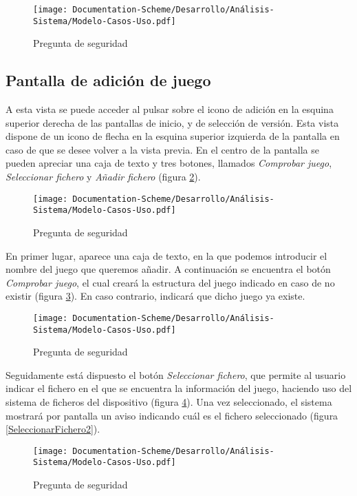 \begin{figure}[H]
    \centering
    \texttt{[image: Documentation-Scheme/Desarrollo/Análisis-Sistema/Modelo-Casos-Uso.pdf]}
    \caption{Pregunta de seguridad}
    \label{PreguntaSeguridad}    
\end{figure}

\subsection{Pantalla de adición de juego}
A esta vista se puede acceder al pulsar sobre el icono de adición en la esquina superior derecha 
de las pantallas de inicio, y de selección de versión. Esta vista dispone de un icono de flecha en la esquina superior 
izquierda de la pantalla en caso de que se desee volver a la vista previa. En el centro de la pantalla se pueden apreciar 
una caja de texto y tres botones, llamados \textit{Comprobar juego}, \textit{Seleccionar fichero} y \textit{Añadir fichero} 
(figura \ref*{AnadirJuego}). 

\begin{figure}[H]
    \centering
    \texttt{[image: Documentation-Scheme/Desarrollo/Análisis-Sistema/Modelo-Casos-Uso.pdf]}
    \caption{Pregunta de seguridad}
    \label{AnadirJuego}    
\end{figure}

En primer lugar, aparece una caja de texto, en la que podemos introducir el nombre del juego que queremos añadir.
A continuación se encuentra el botón \textit{Comprobar juego}, el cual creará la estructura del juego indicado en caso 
de no existir (figura \ref*{ComprobarJuego}). En caso contrario, indicará que dicho juego ya existe. 

\begin{figure}[H]
    \centering
    \texttt{[image: Documentation-Scheme/Desarrollo/Análisis-Sistema/Modelo-Casos-Uso.pdf]}
    \caption{Pregunta de seguridad}
    \label{ComprobarJuego}    
\end{figure}

Seguidamente está dispuesto el 
botón \textit{Seleccionar fichero}, que permite al usuario indicar el fichero en el que se encuentra la información del juego, 
haciendo uso del sistema de ficheros del dispositivo (figura \ref*{SeleccionarFichero1}). Una vez seleccionado, el sistema mostrará por pantalla un aviso indicando 
cuál es el fichero seleccionado (figura \ref*{SeleccionarFichero2}). 

\begin{figure}[H]
    \centering
    \texttt{[image: Documentation-Scheme/Desarrollo/Análisis-Sistema/Modelo-Casos-Uso.pdf]}
    \caption{Pregunta de seguridad}
    \label{SeleccionarFichero1}    
\end{figure}

